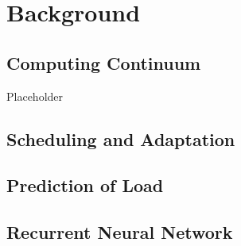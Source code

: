 \chapter{Background}
\label{ch:background}

    \section{Computing Continuum}
    \label{sec:computing-continuum-background}

        Placeholder

    \section{Scheduling and Adaptation}
    \label{sec:scheduling-and-adaptation-background}

    \section{Prediction of Load}
    \label{sec:prediction-of-load-background}

    \section{Recurrent Neural Network}
    \label{sec:rnn-background}

